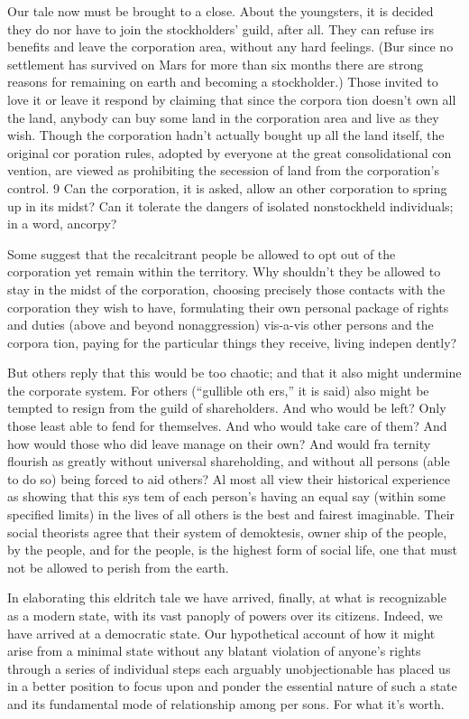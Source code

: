 \documentclass[11pt,openany]{book}
\begin{document}
Our tale now must be brought to a close. About the youngsters, it is decided they do nor have to join the stockholders' guild, after all. They can refuse irs benefits and leave the corporation area, without any hard feelings. (Bur since no settlement has survived on Mars for more than six months there are strong reasons for remaining on earth and becoming a stockholder.) Those invited to love it or leave it respond by claiming that since the corpora tion doesn't own all the land, anybody can buy some land in the corporation area and live as they wish. Though the corporation hadn't actually bought up all the land itself, the original cor poration rules, adopted by everyone at the great consolidational con vention, are viewed as prohibiting the secession of land from the corporation's control. 9 Can the corporation, it is asked, allow an other corporation to spring up in its midst? Can it tolerate the dangers of isolated nonstockheld individuals; in a word, ancorpy? 

Some suggest that the recalcitrant people be allowed to opt out of the corporation yet remain within the territory. Why shouldn't they be allowed to stay in the midst of the corporation, choosing precisely those contacts with the corporation they wish to have, formulating their own personal package of rights and duties (above and beyond nonaggression) vis-a-vis other persons and the corpora tion, paying for the particular things they receive, living indepen dently? 

But others reply that this would be too chaotic; and that it also might undermine the corporate system. For others (``gullible oth ers,'' it is said) also might be tempted to resign from the guild of shareholders. And who would be left? Only those least able to fend for themselves. And who would take care of them? And how would those who did leave manage on their own? And would fra ternity flourish as greatly without universal shareholding, and without all persons (able to do so) being forced to aid others? Al most all view their historical experience as showing that this sys tem of each person's having an equal say (within some specified limits) in the lives of all others is the best and fairest imaginable. Their social theorists agree that their system of demoktesis, owner ship of the people, by the people, and for the people, is the highest form of social life, one that must not be allowed to perish from the earth. 

In elaborating this eldritch tale we have arrived, finally, at what is recognizable as a modern state, with its vast panoply of powers over its citizens. Indeed, we have arrived at a democratic state. Our hypothetical account of how it might arise from a minimal state without any blatant violation of anyone's rights through a series of individual steps each arguably unobjectionable has placed us in a better position to focus upon and ponder the essential nature of such a state and its fundamental mode of relationship among per sons. For what it's worth. 
\end{document}
